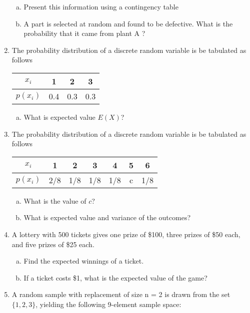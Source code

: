 \documentclass[]{article}
\begin{document}
\begin{enumerate}
\begin{enumerate}[(a)]
\item	Present this information using a contingency table
\item	A part is selected at random and found to be defective. What is the probability that it came from plant A ?
\end{enumerate}

\item The probability distribution of a discrete random variable is be tabulated as follows

\begin{center}
\begin{tabular}{|c||c|c|c|}
\hline
$x_i$  & 1 & 2 & 3  \\\hline
$p(x_i)$ & 0.4 & 0.3 & 0.3 \\ \hline

\end{tabular}
\end{center}

\begin{enumerate}[(a)]
\item What is expected value $E(X)$?
\end{enumerate}


\item The probability distribution of a discrete random variable is be tabulated as follows

\begin{center}
\begin{tabular}{|c||c|c|c|c|c|c|}
\hline
$x_i$  & 1 & 2 & 3 & 4 & 5 & 6 \\\hline
$p(x_i)$ & 2/8 & 1/8& 1/8 & 1/8& c & 1/8\\
\hline
\end{tabular}
\end{center}

\begin{enumerate}[(a)]
\item What is the value of $c$?
\item What is expected value and variance of the outcomes?
\end{enumerate}


\item 

A lottery with 500 tickets gives one prize of \$100, three prizes of \$50 each, and five prizes of \$25 each.
\begin{enumerate}[(a)]
\item  Find the expected winnings of a ticket. 
\item If a ticket costs \$1, what is the expected value of the game?
\end{enumerate}
\item 
A random sample with replacement of size n = 2 is drawn from the set $\{1, 2, 3\}$, yielding the following
9-element sample space:


\end{enumerate}
\end{document}
